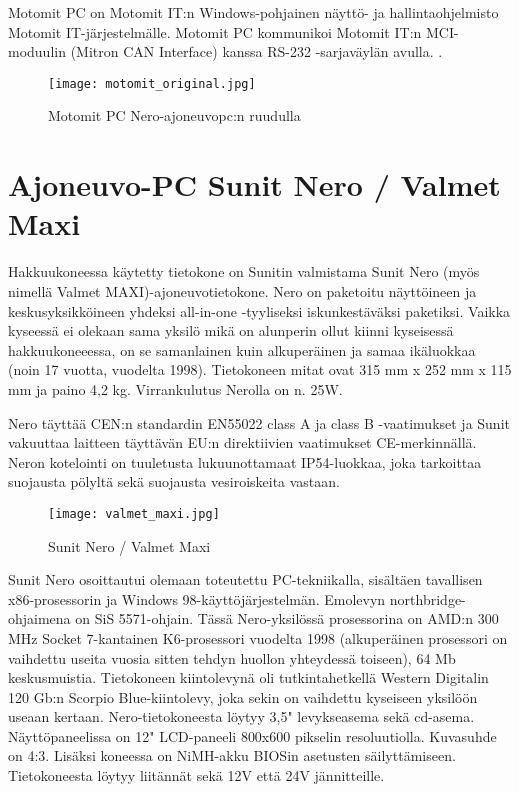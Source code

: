 Motomit PC on Motomit IT:n Windows-pohjainen näyttö- ja hallintaohjelmisto Motomit IT-järjestelmälle. Motomit PC kommunikoi Motomit IT:n MCI-moduulin (Mitron CAN Interface) kanssa RS-232 -sarjaväylän avulla.  \cite{motomit:esite}.
\newline
\begin{figure}[H]
\centering
\texttt{[image: motomit\_original.jpg]}
\caption{Motomit PC Nero-ajoneuvopc:n ruudulla}
\end{figure}

\section{Ajoneuvo-PC Sunit Nero / Valmet Maxi}

Hakkuukoneessa käytetty tietokone on Sunitin valmistama Sunit Nero (myös nimellä Valmet MAXI)-ajoneuvotietokone. Nero on paketoitu näyttöineen ja keskusyksikköineen yhdeksi all-in-one -tyyliseksi iskunkestäväksi paketiksi. Vaikka kyseessä ei olekaan sama yksilö mikä on alunperin ollut kiinni kyseisessä hakkuukoneeessa, on se samanlainen kuin alkuperäinen ja samaa ikäluokkaa (noin 17 vuotta, vuodelta 1998). Tietokoneen mitat ovat 315 mm x 252 mm x 115 mm ja paino 4,2 kg. Virrankulutus Nerolla on n. 25W.

Nero täyttää CEN:n standardin EN55022 class A ja class B -vaatimukset ja Sunit vakuuttaa laitteen täyttävän EU:n direktiivien vaatimukset CE-merkinnällä. Neron kotelointi on tuuletusta lukuunottamaat IP54-luokkaa, joka tarkoittaa suojausta pölyltä sekä suojausta vesiroiskeita vastaan. \cite{nero:manual}

\begin{figure}[H]
\centering
\texttt{[image: valmet\_maxi.jpg]}
\caption{Sunit Nero / Valmet Maxi}
\end{figure}

Sunit Nero osoittautui olemaan toteutettu PC-tekniikalla, sisältäen tavallisen x86-prosessorin ja Windows 98-käyttöjärjestelmän. Emolevyn northbridge-ohjaimena on SiS 5571-ohjain. Tässä Nero-yksilössä prosessorina on AMD:n 300 MHz Socket 7-kantainen K6-prosessori vuodelta 1998 (alkuperäinen prosessori on vaihdettu useita vuosia sitten tehdyn huollon yhteydessä toiseen), 64 Mb keskusmuistia. Tietokoneen kiintolevynä oli tutkintahetkellä Western Digitalin 120 Gb:n Scorpio Blue-kiintolevy, joka sekin on vaihdettu kyseiseen yksilöön useaan kertaan. Nero-tietokoneesta löytyy 3,5" levykseasema sekä cd-asema. Näyttöpaneelissa on 12" LCD-paneeli 800x600 pikselin resoluutiolla. Kuvasuhde on 4:3. Lisäksi koneessa on NiMH-akku BIOSin asetusten säilyttämiseen. Tietokoneesta löytyy liitännät sekä 12V että 24V jännitteille.\cite{nero:manual}
\newline\newline

